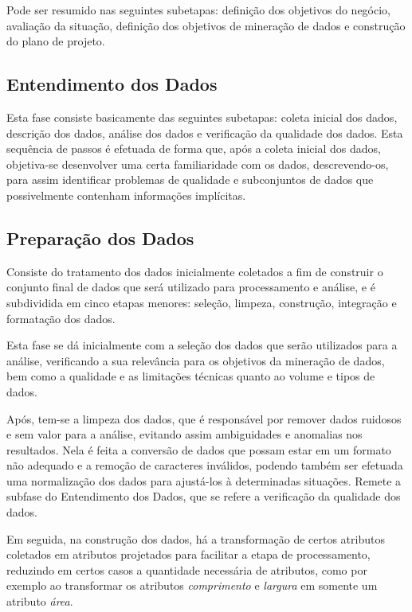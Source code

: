 Pode ser resumido nas seguintes subetapas: definição dos objetivos do negócio, avaliação da situação, definição dos objetivos de mineração de dados e construção do plano de projeto.

\subsection{Entendimento dos Dados}

Esta fase consiste basicamente das seguintes subetapas: coleta inicial dos dados, descrição dos dados, análise dos dados e verificação da qualidade dos dados.
Esta sequência de passos é efetuada de forma que, após a coleta inicial dos dados, objetiva-se desenvolver uma certa familiaridade com os dados, descrevendo-os, para assim identificar problemas de qualidade e subconjuntos de dados que possivelmente contenham informações implícitas.

\subsection{Preparação dos Dados}
\label{sssec:preparacaoDados}

Consiste do tratamento dos dados inicialmente coletados a fim de construir o conjunto final de dados que será utilizado para processamento e análise, e é subdividida em cinco etapas menores: seleção, limpeza, construção, integração e formatação dos dados.

Esta fase se dá inicialmente com a seleção dos dados que serão utilizados para a análise, verificando a sua relevância para os objetivos da mineração de dados, bem como a qualidade e as limitações técnicas quanto ao volume e tipos de dados. 

Após, tem-se a limpeza dos dados, que é responsável por remover dados ruidosos e sem valor para a análise, evitando assim ambiguidades e anomalias nos resultados. 
Nela é feita a conversão de dados que possam estar em um formato não adequado e a remoção de caracteres inválidos, podendo também ser efetuada uma normalização dos dados para ajustá-los à determinadas situações.
Remete a subfase do Entendimento dos Dados, que se refere a verificação da qualidade dos dados. 

Em seguida, na construção dos dados, há a transformação de certos atributos coletados em atributos projetados para facilitar a etapa de processamento, reduzindo em certos casos a quantidade necessária de atributos, como por exemplo ao transformar os atributos \textit{comprimento} e \textit{largura} em somente um atributo \textit{área}. 

